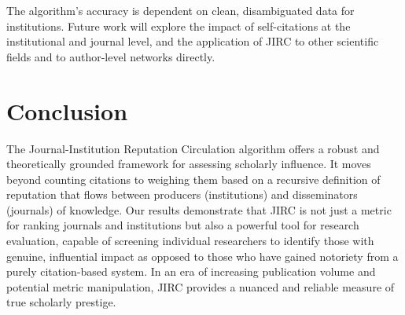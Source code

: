 \documentclass[10pt]{article}
\begin{document}
The algorithm's accuracy is dependent on clean, disambiguated data for institutions. Future work will explore the impact of self-citations at the institutional and journal level, and the application of JIRC to other scientific fields and to author-level networks directly.
\section{Conclusion}

The Journal-Institution Reputation Circulation algorithm offers a robust and theoretically grounded framework for assessing scholarly influence. It moves beyond counting citations to weighing them based on a recursive definition of reputation that flows between producers (institutions) and disseminators (journals) of knowledge. Our results demonstrate that JIRC is not just a metric for ranking journals and institutions but also a powerful tool for research evaluation, capable of screening individual researchers to identify those with genuine, influential impact as opposed to those who have gained notoriety from a purely citation-based system. In an era of increasing publication volume and potential metric manipulation, JIRC provides a nuanced and reliable measure of true scholarly prestige.




\end{document}
